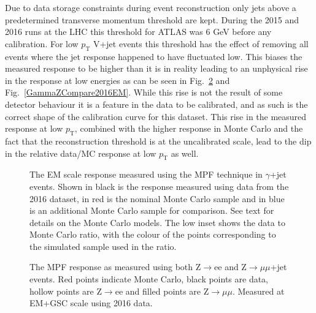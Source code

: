 Due to data storage constraints during event reconstruction only jets above a predetermined transverse momentum threshold are kept.  
During the 2015 and 2016 runs at the LHC this threshold for ATLAS was 6 GeV before any calibration.  
For low $p_{\mathrm T}$ V+jet events this threshold has the effect of removing all events where the jet response happened to have fluctuated low.  
This biases the measured response to be higher than it is in reality leading to an unphysical rise in the response at low energies as can be seen in Fig.~\ref{eemumuCompare2016EM} and Fig.~\ref{GammaZCompare2016EM}.  
While this rise is not the result of some detector behaviour it is a feature in the data to be calibrated, and as such is the correct shape of the calibration curve for this dataset.  
This rise in the measured response at low $p_{\mathrm T}$, combined with the higher response in Monte Carlo and the fact that the reconstruction threshold is at the uncalibrated scale, lead to the dip in the relative data/MC response at low $p_{\mathrm T}$ as well.  


\begin{figure}[!ht]
 \begin{center}
 \end{center}
 \caption[EM scale response using $\gamma$+jet in 2016]
 {\small The EM scale response measured using the MPF technique in $\gamma$+jet events.  Shown in black is the response measured using data from the 2016 dataset, in red is the nominal Monte Carlo sample and in blue is an additional Monte Carlo sample for comparison.  See text for details on the Monte Carlo models.  The low inset shows the data to Monte Carlo ratio, with the colour of the points corresponding to the simulated sample used in the ratio.  }
 \label{Fig:GammaJetEM2016}
\end{figure}


\begin{figure}[!ht]
\begin{center}
\end{center}
\caption[Comparing EM scale response between Z$\rightarrow$ee and Z$\rightarrow\mu\mu$]
{\small The MPF response as measured using both Z$\rightarrow$ee and Z$\rightarrow\mu\mu$+jet events.  Red points indicate Monte Carlo, black points are data, hollow points are Z$\rightarrow$ee and filled points are Z$\rightarrow\mu\mu$.  Measured at EM+GSC scale using 2016 data.  }
\label{eemumuCompare2016EM}
\end{figure}

